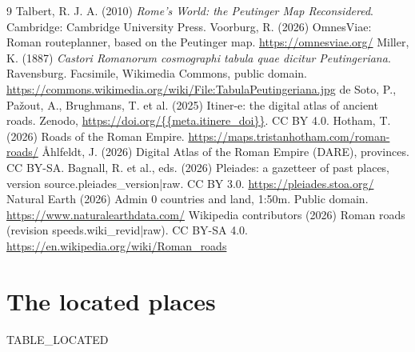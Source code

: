 \documentclass[11pt,a4paper]{article}
\begin{document}
\begin{thebibliography}{9}
 Talbert, R. J. A. (2010) \textit{Rome's World: the Peutinger Map Reconsidered}. Cambridge: Cambridge University Press.
 Voorburg, R. (2026) OmnesViae: Roman routeplanner, based on the Peutinger map. \url{https://omnesviae.org/}
 Miller, K. (1887) \textit{Castori Romanorum cosmographi tabula quae dicitur Peutingeriana}. Ravensburg. Facsimile, Wikimedia Commons, public domain. \url{https://commons.wikimedia.org/wiki/File:TabulaPeutingeriana.jpg}
 de Soto, P., Pa\v{z}out, A., Brughmans, T. et al. (2025) Itiner-e: the digital atlas of ancient roads. Zenodo, \url{https://doi.org/{{meta.itinere_doi}}}. CC BY 4.0.
 Hotham, T. (2026) Roads of the Roman Empire. \url{https://maps.tristanhotham.com/roman-roads/}
 {\AA}hlfeldt, J. (2026) Digital Atlas of the Roman Empire (DARE), provinces. CC BY-SA.
 Bagnall, R. et al., eds. (2026) Pleiades: a gazetteer of past places, version {{source.pleiades_version|raw}}. CC BY 3.0. \url{https://pleiades.stoa.org/}
 Natural Earth (2026) Admin 0 countries and land, 1:50m. Public domain. \url{https://www.naturalearthdata.com/}
 Wikipedia contributors (2026) Roman roads (revision {{speeds.wiki_revid|raw}}). CC BY-SA 4.0. \url{https://en.wikipedia.org/wiki/Roman_roads}
\end{thebibliography}

\clearpage
\appendix
\section{The located places}
{{TABLE_LOCATED}}
\end{document}
